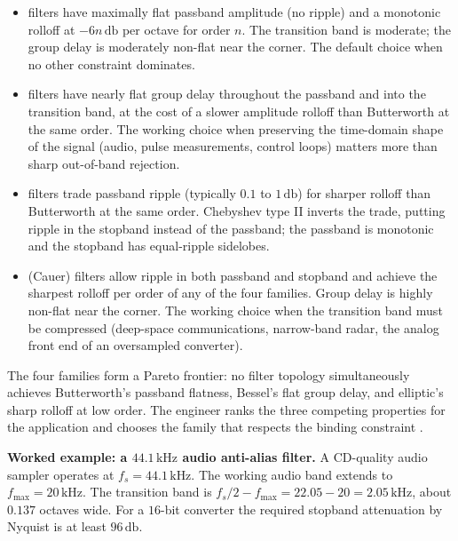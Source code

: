 \begin{itemize}[leftmargin=*]
  \item {} filters have maximally flat passband
    amplitude (no ripple) and a monotonic rolloff at $-6n \,\si
    {\decibel}$ per octave for order $n$. The transition band is
    moderate; the group delay is moderately non-flat near the
    corner. The default choice when no other constraint dominates.
  \item {} filters have nearly flat group delay
    throughout the passband and into the transition band, at the
    cost of a slower amplitude rolloff than Butterworth at the
    same order. The working choice when preserving the time-domain
    shape of the signal (audio, pulse measurements, control loops)
    matters more than sharp out-of-band rejection.
  \item {} filters trade passband ripple
    (typically $0.1$ to $1 \,\si{\decibel}$) for sharper rolloff
    than Butterworth at the same order. Chebyshev type II inverts
    the trade, putting ripple in the stopband instead of the
    passband; the passband is monotonic and the stopband has
    equal-ripple sidelobes.
  \item {} (Cauer) filters allow ripple in both
    passband and stopband and achieve the sharpest rolloff per
    order of any of the four families. Group delay is highly
    non-flat near the corner. The working choice when the
    transition band must be compressed (deep-space communications,
    narrow-band radar, the analog front end of an oversampled
    converter).
\end{itemize}

The four families form a Pareto frontier: no filter topology
simultaneously achieves Butterworth's passband flatness, Bessel's
flat group delay, and elliptic's sharp rolloff at low order. The
engineer ranks the three competing properties for the application
and chooses the family that respects the binding constraint
\cite{text:ch06t3-williams-electronic-filter-2006}.

\textbf{Worked example: a $44.1 \,\si{\kilo\hertz}$ audio
anti-alias filter.} A CD-quality audio sampler operates at $f_{s}
= 44.1 \,\si{\kilo\hertz}$. The working audio band extends to
$f_{\text{max}} = 20 \,\si{\kilo\hertz}$. The transition band is
$f_{s}/2 - f_{\text{max}} = 22.05 - 20 = 2.05 \,\si{\kilo\hertz}$,
about $0.137$ octaves wide. For a $16$-bit converter the required
stopband attenuation by Nyquist is at least $96 \,\si{\decibel}$.

